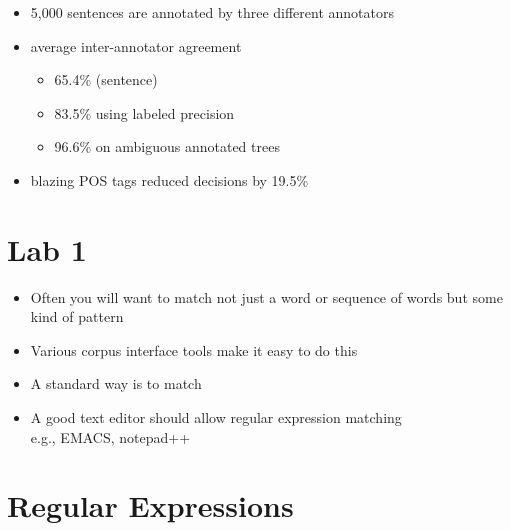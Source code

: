 \documentclass[a4paper,landscape,headrule,footrule,dvips]{foils}
\begin{document}
\begin{CJK}{UTF8}{min}

\begin{itemize}
\item   5,000 sentences are annotated by three different annotators
\item  average inter-annotator agreement
  \begin{itemize}
  \item   65.4\% (sentence)
  \item  83.5\% using labeled precision
  \item 96.6\% on ambiguous annotated trees 
  \end{itemize}
\item blazing  POS tags reduced decisions by 19.5\%
\end{itemize}

\section{Lab 1}


\begin{itemize}
\item Often you will want to match not just a word or sequence of
  words but some kind of pattern
\item Various corpus interface tools make it easy to do this
\item A standard way is to match 
\item A good text editor should allow regular expression matching
\\ e.g., EMACS, notepad++
\end{itemize}

\section{Regular Expressions}


\end{CJK}
\end{document}
